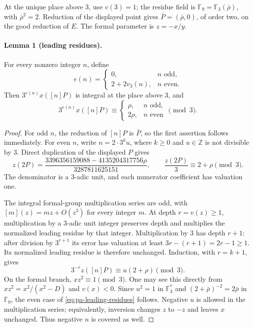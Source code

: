 At the unique place above $3$, use $v(3)=1$; the residue field is
$\mathbb F_9=\mathbb F_3(\bar\rho)$, with $\bar\rho^2=2$.
Reduction of the displayed point gives
$\bar P=(\bar\rho,0)$, of order two, on the good reduction of $E$.
The formal parameter is $z=-x/y$.

\paragraph{Lemma 1 (leading residues).}
For every nonzero integer $n$, define
\[
 e(n)=\begin{cases}
 0,&n\text{ odd},\\
 2+2v_3(n),&n\text{ even}.
 \end{cases}
\]
Then $3^{e(n)}x([n]P)$ is integral at the place above $3$, and
\begin{equation}\label{eq:pa-leading-residues}
 3^{e(n)}x([n]P)\equiv
 \begin{cases}
 \rho,&n\text{ odd},\\
 2\rho,&n\text{ even}
 \end{cases}\pmod3.
\end{equation}

\begin{proof}
For odd $n$, the reduction of $[n]P$ is $\bar P$, so the first assertion
follows immediately.  For even $n$, write
$n=2\cdot3^ku$, where $k\ge0$ and $u\in\mathbb Z$ is not divisible by
$3$.  Direct duplication of the displayed $P$ gives
\[
 z(2P)=
 \frac{3396356159088-4135204317756\rho}{3287811625151},
 \qquad \frac{z(2P)}3\equiv2+\rho\pmod3.
\]
The denominator is a $3$-adic unit, and each numerator coefficient has
valuation one.

The integral formal-group multiplication series are odd, with
$[m](z)=mz+O(z^3)$ for every integer $m$.  At depth $r=v(z)\ge1$,
multiplication by a $3$-adic unit integer preserves depth and multiplies
the normalized leading residue by that integer.  Multiplication by $3$
has depth $r+1$: after division by $3^{r+1}$ its error has valuation at
least $3r-(r+1)=2r-1\ge1$.  Its normalized leading residue is therefore
unchanged.  Induction, with $r=k+1$, gives
\[
 3^{-r}z([n]P)\equiv u(2+\rho)\pmod3.
\]
On the formal branch, $xz^2\equiv1\pmod3$.  One may see this directly
from $xz^2=x^2/(x^2-D)$ and $v(x)<0$.  Since $u^2=1$ in
$\mathbb F_3^*$ and
$(2+\bar\rho)^{-2}=2\bar\rho$ in $\mathbb F_9$, the even case of
\eqref{eq:pa-leading-residues} follows.  Negative $u$ is allowed in the
multiplication series; equivalently, inversion changes $z$ to $-z$ and
leaves $x$ unchanged.  Thus negative $n$ is covered as well.
\end{proof}

